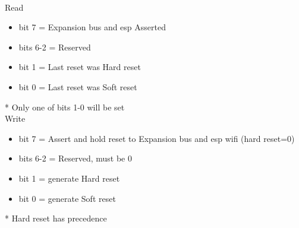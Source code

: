 \\
Read
\begin{itemize}
\item bit 7 = Expansion bus and esp  Asserted
\item bits 6-2 = Reserved
\item bit 1 = Last reset was Hard reset
\item bit 0 = Last reset was Soft reset
\end{itemize}
* Only one of bits 1-0 will be set\\
Write
\begin{itemize}
\item bit 7 = Assert and hold reset to Expansion bus and esp wifi (hard reset=0)
\item bits 6-2 = Reserved, must be 0
\item bit 1 = generate Hard reset
\item bit 0 = generate Soft reset
\end{itemize}
* Hard reset has precedence
